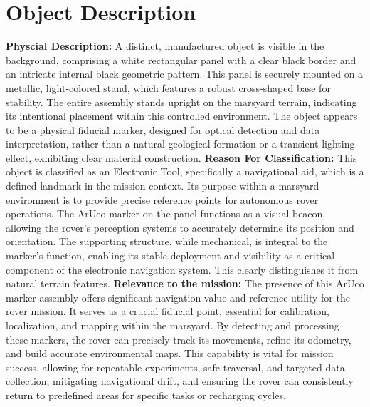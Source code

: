 \documentclass[a4paper,12pt]{report}
\begin{document}
    \section*{Object Description}
    \textbf{Physcial Description:} A distinct, manufactured object is visible in the background, comprising a white rectangular panel with a clear black border and an intricate internal black geometric pattern. This panel is securely mounted on a metallic, light-colored stand, which features a robust cross-shaped base for stability. The entire assembly stands upright on the marsyard terrain, indicating its intentional placement within this controlled environment. The object appears to be a physical fiducial marker, designed for optical detection and data interpretation, rather than a natural geological formation or a transient lighting effect, exhibiting clear material construction. \newline\newline
    \textbf{Reason For Classification:} This object is classified as an Electronic Tool, specifically a navigational aid, which is a defined landmark in the mission context. Its purpose within a marsyard environment is to provide precise reference points for autonomous rover operations. The ArUco marker on the panel functions as a visual beacon, allowing the rover's perception systems to accurately determine its position and orientation. The supporting structure, while mechanical, is integral to the marker's function, enabling its stable deployment and visibility as a critical component of the electronic navigation system. This clearly distinguishes it from natural terrain features. \newline\newline
    \textbf{Relevance to the mission:} The presence of this ArUco marker assembly offers significant navigation value and reference utility for the rover mission. It serves as a crucial fiducial point, essential for calibration, localization, and mapping within the marsyard. By detecting and processing these markers, the rover can precisely track its movements, refine its odometry, and build accurate environmental maps. This capability is vital for mission success, allowing for repeatable experiments, safe traversal, and targeted data collection, mitigating navigational drift, and ensuring the rover can consistently return to predefined areas for specific tasks or recharging cycles. 
    
    \clearpage
    
\end{document}
